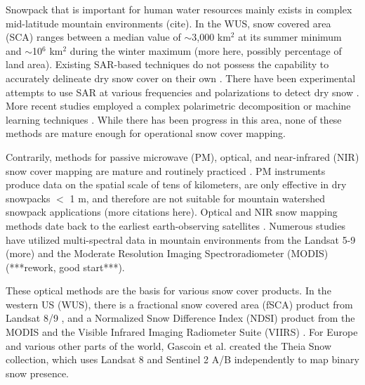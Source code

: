 Snowpack that is important for human water resources mainly exists in complex mid-latitude mountain environments (cite). In the WUS, snow covered area (SCA) ranges between a median value of $\sim$3,000 km$^{2}$ at its summer minimum and $\sim$10$^{6}$ km$^{2}$ during the winter maximum \citep{rittgerSnowToday2022} (more here, possibly percentage of land area). Existing SAR-based techniques do not possess the capability to accurately delineate dry snow cover on their own \citep{tsaiRemoteSensingSnow2019}. There have been experimental attempts to use SAR at various frequencies and polarizations to detect dry snow \citep{rottThematicStudiesAlpine1994, shiMappingSeasonalSnow1997}. More recent studies employed a complex polarimetric decomposition \cite{varadeIdentificationSnowUsing2020} or machine learning techniques \cite{tsaiWetDrySnow2019}. While there has been progress in this area, none of these methods are mature enough for operational snow cover mapping. \par

Contrarily, methods for passive microwave (PM), optical, and near-infrared (NIR) snow cover mapping are mature and routinely practiced \citep{dozierMultispectralHyperspectralRemote2004,saberiReviewSnowWater2020}. PM instruments produce data on the spatial scale of tens of kilometers, are only effective in dry snowpacks $<$ 1 m, and therefore are not suitable for mountain watershed snowpack applications (more citations here). Optical and NIR snow mapping methods date back to the earliest earth-observing satellites \citep{rangoSatellitePotentialsSnowcover1976a}. Numerous studies have utilized multi-spectral data in mountain environments from the Landsat 5-9 \citep{dozierSpectralSignatureAlpine1989} (more) and the Moderate Resolution Imaging Spectroradiometer (MODIS) \citep{painterRetrievalSubpixelSnowcovered2003, painterRetrievalSubpixelSnow2009, rittgerAssessmentMethodsMapping2013} (***rework, good start***). 

These optical methods are the basis for various snow cover products. In the western US (WUS), there is a fractional snow covered area (fSCA) product from Landsat 8/9 \citep{selkowitzUSGSLandsatSnow2017}, and a Normalized Snow Difference Index (NDSI) \citep{dozierSpectralSignatureAlpine1989, hallDevelopmentMethodsMapping1995} product from the MODIS \citep{hallMODISSnowcoverProducts2002} and the Visible Infrared Imaging Radiometer Suite (VIIRS) \citep{justiceLandCryosphereProducts2013}. For Europe and various other parts of the world, Gascoin et al. \citep{gascoinTheiaSnowCollection2019a} created the Theia Snow collection, which uses Landsat 8 and Sentinel 2 A/B independently to map binary snow presence.

